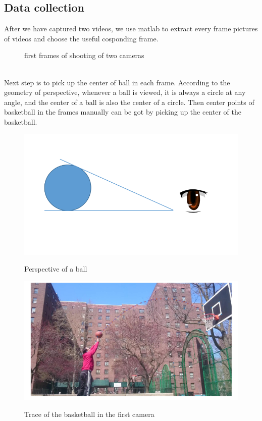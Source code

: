 \documentclass[10pt,journal,compsoc]{IEEEtran}
\begin{document}
\subsection{Data collection}
After we have captured two videos, we use matlab to extract every frame pictures of videos and choose the useful cosponding frame.
\begin{figure}[h]
\centering
{}
\caption{first frames of shooting of two cameras}
\end{figure}
\\Next step is to pick up the center of ball in each frame. According to the geometry of perspective, whenever a ball is viewed, it is always a circle at any angle, and the center of a ball is also the center of a circle. Then center points of basketball in the frames manually can be got by picking up the center of the basketball.
\begin{figure}[h]
\centering
\subfloat
{
\includegraphics[width=3.4 in]{ball_view.png}
}
\caption{Perspective of a ball}
\end{figure}

\begin{figure}[h]
\subfloat
{
\includegraphics[width=3.4 in]{balltrace_nan.png}
}
\caption{Trace of the basketball in the first camera}
\end{figure}
\end{document}

